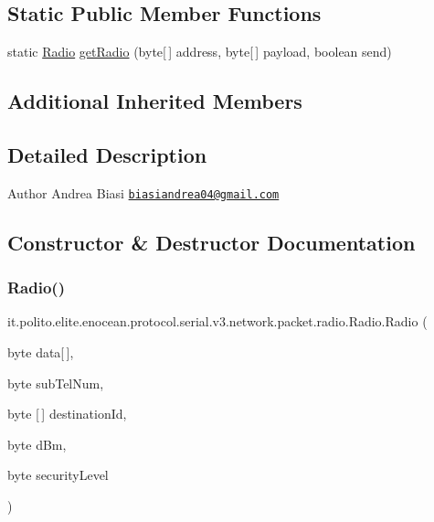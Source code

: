 \subsection*{Static Public Member Functions}
\begin{DoxyCompactItemize}
\item 
static \hyperlink{classit_1_1polito_1_1elite_1_1enocean_1_1protocol_1_1serial_1_1v3_1_1network_1_1packet_1_1radio_1_1_radio}{Radio} \hyperlink{classit_1_1polito_1_1elite_1_1enocean_1_1protocol_1_1serial_1_1v3_1_1network_1_1packet_1_1radio_1_1_radio_a037dae1b2747a7599a491b265eb0f540}{get\+Radio} (byte\mbox{[}$\,$\mbox{]} address, byte\mbox{[}$\,$\mbox{]} payload, boolean send)
\end{DoxyCompactItemize}
\subsection*{Additional Inherited Members}


\subsection{Detailed Description}
\begin{DoxyAuthor}{Author}
Andrea Biasi \href{mailto:biasiandrea04@gmail.com}{\tt biasiandrea04@gmail.\+com} 
\end{DoxyAuthor}


\subsection{Constructor \& Destructor Documentation}
\hypertarget{classit_1_1polito_1_1elite_1_1enocean_1_1protocol_1_1serial_1_1v3_1_1network_1_1packet_1_1radio_1_1_radio_aa4372049bcbfeafcfd42bb8273873ea1}{}\label{classit_1_1polito_1_1elite_1_1enocean_1_1protocol_1_1serial_1_1v3_1_1network_1_1packet_1_1radio_1_1_radio_aa4372049bcbfeafcfd42bb8273873ea1} 
\subsubsection{\texorpdfstring{Radio()}{Radio()}\hspace{0.1cm}{\footnotesize\ttfamily [1/3]}}
{\footnotesize\ttfamily it.\+polito.\+elite.\+enocean.\+protocol.\+serial.\+v3.\+network.\+packet.\+radio.\+Radio.\+Radio (\begin{DoxyParamCaption}\item[{byte}]{data\mbox{[}$\,$\mbox{]},  }\item[{byte}]{sub\+Tel\+Num,  }\item[{byte \mbox{[}$\,$\mbox{]}}]{destination\+Id,  }\item[{byte}]{d\+Bm,  }\item[{byte}]{security\+Level }\end{DoxyParamCaption})}

